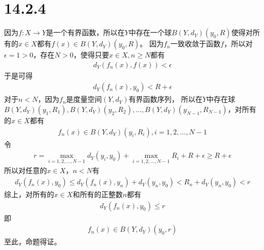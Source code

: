 \documentclass{article}
\begin{document}
\section*{14.2.4}

因为$f: X \to Y$是一个有界函数，所以在$Y$中存在一个球$B(Y,d_Y)(y_0, R)$使得对所有的$x \in X$都有$f(x) \in B(Y,d_Y)(y_0, R)$。
因为$f_n$一致收敛于函数$f$，所以对$\epsilon = 1 > 0$，存在$N > 0$，使得只要$x \in X, n \geq N$都有
\begin{align*}
  d_Y(f_n(x), f(x)) < \epsilon
\end{align*}
于是可得
\begin{align*}
  d_Y(f_n(x), y_0) < R + \epsilon
\end{align*}
对于$n < N$，因为$f_n$是度量空间$(Y, d_Y)$有界函数序列，
所以在$Y$中存在球$B(Y, d_Y)(y_1, R_1), B(Y, d_Y)(y_2, R_2), \dots, B(Y, d_Y)(y_{N - 1}, R_{N - 1})$，对所有的$x \in X$都有
\begin{align*}
  f_n(x) \in B(Y, d_Y)(y_i, R_i), i = 1, 2, \dots, N - 1
\end{align*}
令
\begin{align*}
  r = \max\limits_{i = 1, 2, \dots, N - 1} d_Y(y_i, y_0) + \max\limits_{i = 1, 2, \dots, N - 1} R_i + R + \epsilon \geq R + \epsilon
\end{align*}
所以对任意的$x \in X$，$n < N$有
\begin{align*}
  d_Y(f_n(x), y_0) \leq d_Y(f_n(x), y_n) + d_Y(y_n, y_0) < R_n + d_Y(y_n, y_0) < r
\end{align*}
综上，对所有的$x \in X$和所有的正整数$n$都有
\begin{align*}
  d_Y(f_n(x), y_0) \leq r
\end{align*}
即
\begin{align*}
  f_n(x) \in B(Y, d_Y)(y_0, r)
\end{align*}
至此，命题得证。
\end{document}
